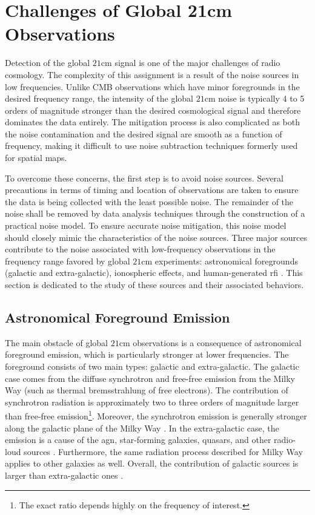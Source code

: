 \documentclass[12pt, TexShade, letterpaper]{report}
\begin{document}
\section{Challenges of Global 21cm Observations}
Detection of the global $\mathrm{21cm}$ signal is one of the major challenges of radio cosmology. The complexity of this assignment is a result of the noise sources in low frequencies. Unlike CMB observations which have minor foregrounds in the desired frequency range, the intensity of the  global $\mathrm{21cm}$ noise is typically 4 to 5 orders of magnitude stronger than the desired cosmological signal and therefore dominates the data entirely. The mitigation process is also complicated as both the noise contamination and the desired signal are smooth as a function of frequency, making it difficult to use noise subtraction techniques formerly used for spatial maps\cite{liu2013global, thesis_moso, thesis_shedding}.\par
To overcome these concerns, the first step is to avoid noise sources. Several precautions in terms of timing and location of observations are taken to ensure the data is being collected with the least possible noise. The remainder of the noise shall be removed by data analysis techniques through the construction of a practical noise model. To ensure accurate noise mitigation, this noise model should closely mimic the characteristics of the noise sources. Three major sources contribute to the noise associated with low-frequency observations in the frequency range favored by global $\mathrm{21cm}$ experiments: astronomical foregrounds (galactic and extra-galactic), ionospheric effects, and human-generated \gls{rfi} \cite{thesis_pamela, thesis_shedding, book_21cm}. This section is dedicated to the study of these sources and their associated behaviors.\par

\subsection{Astronomical Foreground Emission}
The main obstacle of global $\mathrm{21cm}$ observations is a consequence of astronomical foreground emission, which is particularly stronger at lower frequencies. The foreground consists of two main types: galactic and extra-galactic. The galactic case comes from the diffuse synchrotron and free-free emission from the Milky Way (such as thermal bremsstrahlung of free electrons). The contribution of synchrotron radiation is approximately two to three orders of magnitude larger than free-free emission\footnote{The exact ratio depends highly on the frequency of interest.}. Moreover, the synchrotron emission is generally stronger along the galactic plane of the Milky Way \cite{thesis_shedding, thesis_pamela, pritchard_mcmc, reionization_old}.
In the extra-galactic case, the emission is a cause of the \gls{agn}, star-forming galaxies, quasars, and other radio-loud sources \cite{book_21cm}. Furthermore, the same radiation process described for Milky Way applies to other galaxies as well. Overall, the contribution of galactic sources is larger than extra-galactic ones \cite{pritchard_mcmc, reionization_old}.\par
\end{document}
